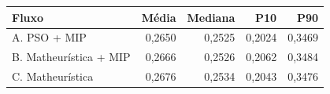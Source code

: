 \begin{tabular}{lrrrr}
\toprule
Fluxo & Média & Mediana & P10 & P90 \\
\midrule
A. PSO + MIP & 0,2650 & 0,2525 & 0,2024 & 0,3469 \\
B. Matheurística + MIP & 0,2666 & 0,2526 & 0,2062 & 0,3484 \\
C. Matheurística & 0,2676 & 0,2534 & 0,2043 & 0,3476 \\
\bottomrule
\end{tabular}
